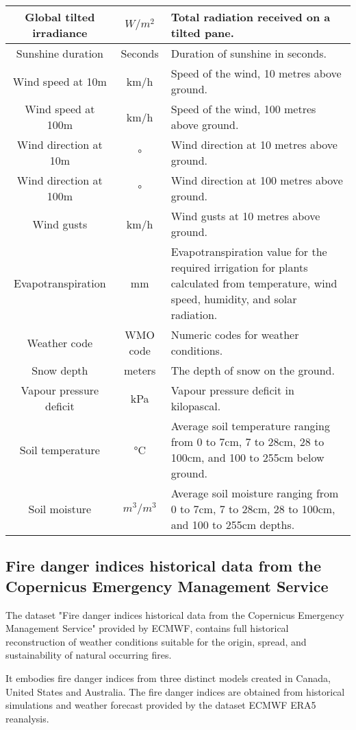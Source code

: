 \begin{table}[h!]
\begin{tabular}{|c|c|p{10cm}|}
\hline
Global tilted irradiance & $W/m^2$ & Total radiation received on a tilted pane.  \\
\hline
Sunshine duration & Seconds & Duration of sunshine in seconds.  \\
\hline
Wind speed at 10m & km/h & Speed of the wind, 10 metres above ground.  \\
\hline
Wind speed at 100m & km/h & Speed of the wind, 100 metres above ground.  \\
\hline
Wind direction at 10m & ° & Wind direction at 10 metres above ground.  \\
\hline
Wind direction at 100m & ° & Wind direction at 100 metres above ground.  \\
\hline
Wind gusts & km/h & Wind gusts at 10 metres above ground.  \\
\hline
Evapotranspiration & mm & Evapotranspiration value for the required irrigation for plants calculated from temperature, wind speed, humidity, and solar radiation. \\
\hline
Weather code & WMO code & Numeric codes for weather conditions.  \\
\hline
Snow depth & meters & The depth of snow on the ground.  \\
\hline
Vapour pressure deficit & kPa & Vapour pressure deficit in kilopascal.\\
\hline
Soil temperature & °C & Average soil temperature ranging from 0 to 7cm, 7 to 28cm, 28 to 100cm, and 100 to 255cm below ground.\\
\hline
Soil moisture & $m^3/m^3$ & Average soil moisture ranging from 0 to 7cm, 7 to 28cm, 28 to 100cm, and 100 to 255cm depths.\\
\hline
\end{tabular}
\end{table}

\subsection{Fire danger indices historical data from the Copernicus Emergency Management Service \cite{CopernicusCDS2019}}
The dataset "Fire danger indices historical data from the Copernicus Emergency Management Service" \cite{CopernicusCDS2019} provided by ECMWF, contains full historical reconstruction of weather conditions suitable for the origin, spread, and sustainability of natural occurring fires. 

It embodies fire danger indices from three distinct models created in Canada, United States and Australia. The fire danger indices are obtained from historical simulations and weather forecast provided by the dataset ECMWF ERA5 reanalysis. 

